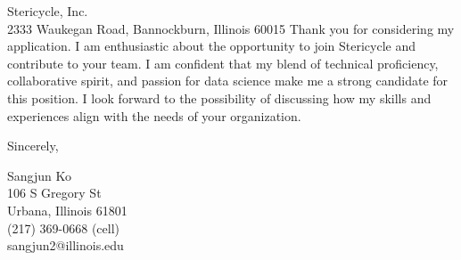 \documentclass{letter}
\begin{document}
\begin{letter}{Stericycle, Inc.\\
2333 Waukegan Road, Bannockburn, Illinois 60015}
Thank you for considering my application. I am enthusiastic about the
 opportunity to join Stericycle and contribute to your team. I am 
 confident that my blend of technical proficiency, collaborative 
 spirit, and passion for data science make me a strong candidate 
 for this position. I look forward to the possibility of discussing 
 how my skills and experiences align with the needs of your organization.


\closing{Sincerely,
}

Sangjun Ko\\
106 S Gregory St\\
Urbana, Illinois 61801\\
(217) 369-0668 (cell)\\sangjun2@illinois.edu
\end{letter}
\end{document}
